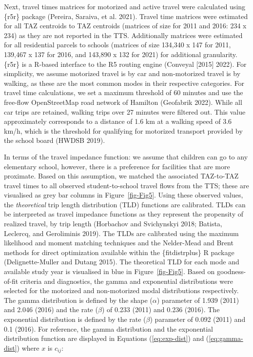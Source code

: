 \documentclass[
default
]{sn-jnl}
\begin{document}
Next, travel times matrices for motorized and active travel were
calculated using \{r5r\} package (Pereira, Saraiva, et al. 2021). Travel
time matrices were estimated for all TAZ centroids to TAZ centroids
(matrices of size for 2011 and 2016: 234 x 234) as they are not reported
in the TTS. Additionally matrices were estimated for all residential
parcels to schools (matrices of size 134,340 x 147 for 2011, 139,467 x
137 for 2016, and 143,890 x 132 for 2021) for additional granularity.
\{r5r\} is a R-based interface to the R5 routing engine (Conveyal
{[}2015{]} 2022). For simplicity, we assume motorized travel is by car
and non-motorized travel is by walking, as these are the most common
modes in their respective categories. For travel time calculations, we
set a maximum threshold of 60 minutes and use the free-flow
OpenStreetMap road network of Hamilton (Geofabrik 2022). While all car
trips are retained, walking trips over 27 minutes were filtered out.
This value approximately corresponds to a distance of 1.6 km at a
walking speed of 3.6 km/h, which is the threshold for qualifying for
motorized transport provided by the school board (HWDSB 2019).

In terms of the travel impedance function: we assume that children can
go to any elementary school, however, there is a preference for
facilities that are more proximate. Based on this assumption, we matched
the associated TAZ-to-TAZ travel times to all observed student-to-school
travel flows from the TTS; these are visualised as grey bar columns in
Figure~\ref{fig-Fig5}. Using these observed values, the
\emph{theoretical} trip length distribution (TLD) functions are
calibrated. TLDs can be interpreted as travel impedance functions as
they represent the propensity of realized travel, by trip length
(Horbachov and Svichynskyi 2018; Batista, Leclercq, and Geroliminis
2019). The TLDs are calibrated using the maximum likelihood and moment
matching techniques and the Nelder-Mead and Brent methods for direct
optimization available within the \{fitdistrplus\} R package
(Delignette-Muller and Dutang 2015). The theoretical TLD for each mode
and available study year is visualised in blue in Figure~\ref{fig-Fig5}.
Based on goodness-of-fit criteria and diagnostics, the gamma and
exponential distributions were selected for the motorized and
non-motorized modal distributions respectively. The gamma distribution
is defined by the shape (\(\alpha\)) parameter of 1.939 (2011) and 2.046
(2016) and the rate (\(\beta\)) of 0.233 (2011) and 0.236 (2016). The
exponential distribution is defined by the rate (\(\beta\)) parameter of
0.092 (2011) and 0.1 (2016). For reference, the gamma distribution and
the exponential distribution function are displayed in Equations
(\ref{eq:exp-dist}) and (\ref{eq:gamma-dist}) where \(x\) is \(c_{ij}\):
\end{document}
